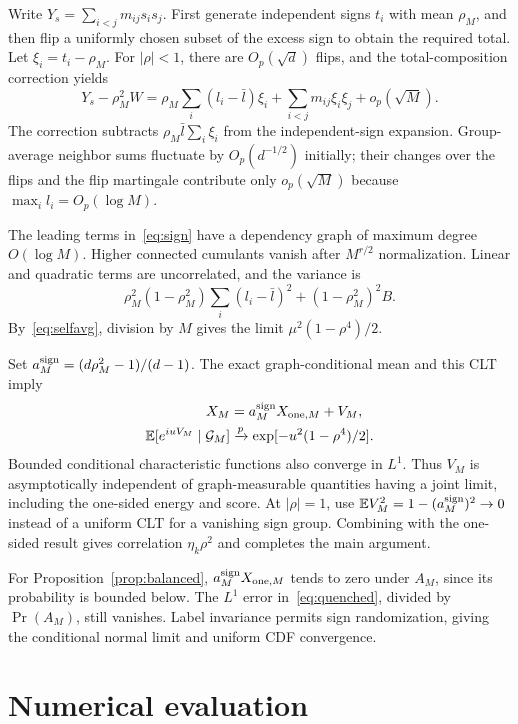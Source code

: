 \documentclass[11pt,a4paper]{article}
\newcommand{\E}{\mathbb E}
\begin{document}
Write $Y_s=\sum_{i<j}m_{ij}s_is_j$. First generate independent signs $t_i$ with mean $\rho_M$, and then flip a uniformly chosen subset of the excess sign to obtain the required total. Let $\xi_i=t_i-\rho_M$. For $|\rho|<1$, there are $O_p(\sqrt d)$ flips, and the total-composition correction yields
\begin{equation}
Y_s-\rho_M^2W=
\rho_M\sum_i(l_i-\bar l)\xi_i+
\sum_{i<j}m_{ij}\xi_i\xi_j+o_p(\sqrt M).\label{eq:sign}
\end{equation}
The correction subtracts $\rho_M\bar l\sum_i\xi_i$ from the independent-sign expansion. Group-average neighbor sums fluctuate by $O_p(d^{-1/2})$ initially; their changes over the flips and the flip martingale contribute only $o_p(\sqrt M)$ because $\max_i l_i=O_p(\log M)$.

The leading terms in~\eqref{eq:sign} have a dependency graph of maximum degree $O(\log M)$. Higher connected cumulants vanish after $M^{r/2}$ normalization. Linear and quadratic terms are uncorrelated, and the variance is
\begin{equation}
\rho_M^2(1-\rho_M^2)\sum_i(l_i-\bar l)^2+(1-\rho_M^2)^2B.
\end{equation}
By~\eqref{eq:selfavg}, division by $M$ gives the limit $\mu^2(1-\rho^4)/2$.

Set $a_M^{\rm sign}=(d\rho_M^2-1)/(d-1)$. The exact graph-conditional mean and this CLT imply
\begin{align}
X_M&=a_M^{\rm sign}X_{{\rm one},M}+V_M,\\
\E[e^{iuV_M}\mid\mathcal G_M]&\xrightarrow p
\exp[-u^2(1-\rho^4)/2].\label{eq:quenched}
\end{align}
Bounded conditional characteristic functions also converge in $L^1$. Thus $V_M$ is asymptotically independent of graph-measurable quantities having a joint limit, including the one-sided energy and score. At $|\rho|=1$, use
$\E V_M^2=1-(a_M^{\rm sign})^2\to0$ instead of a uniform CLT for a vanishing sign group. Combining with the one-sided result gives correlation $\eta_k\rho^2$ and completes the main argument.

For Proposition~\ref{prop:balanced}, $a_M^{\rm sign}X_{{\rm one},M}$ tends to zero under $A_M$, since its probability is bounded below. The $L^1$ error in~\eqref{eq:quenched}, divided by $\Pr(A_M)$, still vanishes. Label invariance permits sign randomization, giving the conditional normal limit and uniform CDF convergence.

\section{Numerical evaluation}
\end{document}
